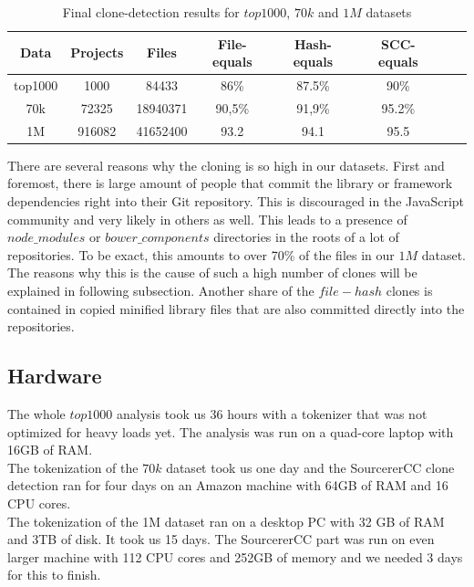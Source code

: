 \documentclass[thesis=M,english]{FITthesis}[2012/10/20]
\begin{document}
\begin{table}[]
\centering
\begin{tabular}{@{}cccccccc@{}}
\toprule

Data & Projects & Files & File-equals & Hash-equals & SCC- equals & \\ \midrule
top1000  & 1000  & 84433 & 86\%   & 87.5\% & 90\% &\\
70k  & 72325   & 18940371  & 90,5\% & 91,9\% & 95.2\% & \\
1M  & 916082  & 41652400 &  93.2 & 94.1 & 95.5 & \\
\bottomrule
\end{tabular}
\caption{Final clone-detection results for $top1000$, $70k$ and $1M$ datasets}
\label{gh_meta_popularity}
\end{table}

There are several reasons why the cloning is so high in our datasets. First and foremost, there is large amount of people that commit the library or framework dependencies right into their Git repository. This is discouraged in the JavaScript community and very likely in others as well. This leads to a presence of $node\_modules$ or $bower\_components$ directories in the roots of a lot of repositories. To be exact, this amounts to over 70\% of the files in our $1M$ dataset. The reasons why this is the cause of such a high number of clones will be explained in following subsection. Another share of the $file-hash$ clones is contained in copied minified library files that are also committed directly into the repositories.\\



\subsection{Hardware}

The whole $top1000$ analysis took us 36 hours with a tokenizer that was not optimized for heavy loads yet. The analysis was run on a quad-core laptop with 16GB of RAM. \\

The tokenization of the $70k$ dataset took us one day and the SourcererCC clone detection ran for four days on an Amazon machine with 64GB of RAM and 16 CPU cores. \\

The tokenization of the 1M dataset ran on a desktop PC with 32 GB of RAM and 3TB of disk. It took us 15 days. The SourcererCC part was run on even larger machine with 112 CPU cores and 252GB of memory and we needed 3 days for this to finish. \\
\end{document}
